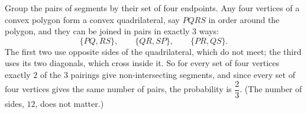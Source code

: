 Group the pairs of segments by their set of four endpoints. Any four vertices of a convex polygon form a convex quadrilateral, say $PQRS$ in order around the polygon, and they can be joined in pairs in exactly $3$ ways:
\[
\{PQ,RS\},\qquad\{QR,SP\},\qquad\{PR,QS\}.
\]
The first two use opposite sides of the quadrilateral, which do not meet; the third uses its two diagonals, which cross inside it. So for every set of four vertices exactly $2$ of the $3$ pairings give non-intersecting segments, and since every set of four vertices gives the same number of pairs, the probability is $\boxed{\dfrac{2}{3}}$. (The number of sides, $12$, does not matter.)
